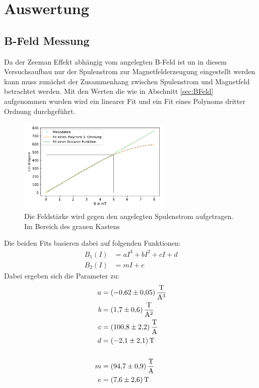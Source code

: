 \newpage
\section{Auswertung}
\label{sec:auswertung}
\subsection{B-Feld Messung}
Da der Zeeman Effekt abhängig vom angelegten B-Feld ist un in diesem Versuchsaufbau nur der Spulenstrom zur Magnetfelderzeugung eingestellt werden kann muss zunächst der Zusammenhang zwischen Spulenstrom und Magnetfeld betrachtet werden.
Mit den Werten die wie in Abschnitt \ref{sec:BFeld} aufgenommen wurden wird ein linearer Fit und ein Fit eines Polynoms dritter Ordnung durchgeführt.\\
\begin{figure}[ht]
    \center
    \includegraphics[width=0.65\textwidth]{plots/B_Feld.pdf}
    \caption{Die Feldstärke wird gegen den angelegten Spulenstrom aufgetragen. Im Bereich des grauen Kastens }
    \label{fig:B_Feld}
\end{figure}
Die beiden Fits basieren dabei auf folgenden Funktionen:
\begin{align*}
    B_1(I) &= aI^3+bI^2+cI+d\\
    B_2(I) &= mI+e
\end{align*}
Dabei ergeben sich die Parameter zu:
\begin{align*}
    a &= \SI[per-mode = fraction]{-0.62 +- 0.05}{\tesla \per \cubic \ampere}\\
    b &= \SI[per-mode = fraction]{1.7+-0.6}{\tesla \per \square \ampere}\\
    c &= \SI[per-mode = fraction]{100.8+-2.2}{\tesla \per \ampere}\\
    d &= \SI[per-mode = fraction]{-2.1+-2.1}{\tesla}\\
    \\
    m &= \SI[per-mode = fraction]{94.7+-0.9}{\tesla \per \ampere}\\
    e &= \SI[per-mode = fraction]{7.6+-2.6}{\tesla}\\ 
\end{align*}
